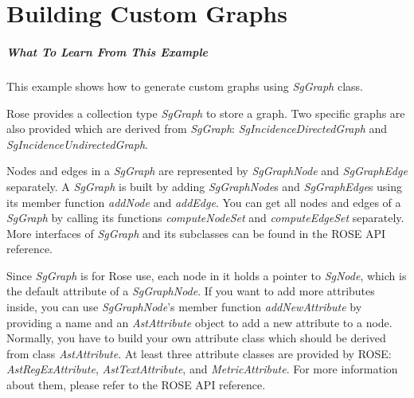 \chapter{Building Custom Graphs}
\label{Tutorial:chapterCustomGraphs}

\paragraph{What To Learn From This Example}
This example shows how to generate custom graphs using \textit{SgGraph} class.

Rose provides a collection type \textit{SgGraph} to store a graph. Two specific graphs
are also provided which are derived from \textit{SgGraph}: \textit{SgIncidenceDirectedGraph} and
\textit{SgIncidenceUndirectedGraph}.

Nodes and edges in a \textit{SgGraph} are represented by \textit{SgGraphNode} and \textit{SgGraphEdge} separately. 
A \textit{SgGraph} is built by adding \textit{SgGraphNode}s and \textit{SgGraphEdge}s using its member function
\textit{addNode} and \textit{addEdge}. You can get all nodes and edges of a \textit{SgGraph} by calling its functions
\textit{computeNodeSet} and \textit{computeEdgeSet} separately.
More interfaces of \textit{SgGraph} and its subclasses can be found in the ROSE API reference.

Since \textit{SgGraph} is for Rose use, each node in it holds a pointer to \textit{SgNode}, which is 
the default attribute of a \textit{SgGraphNode}. If you want to add more attributes inside, you
can use \textit{SgGraphNode}'s member function \textit{addNewAttribute} by providing a name and an \textit{AstAttribute}
object to add a new attribute to a node. Normally, you have to build your own 
attribute class which should be derived from class
\textit{AstAttribute}. At least three attribute
classes are provided by ROSE: \textit{AstRegExAttribute}, \textit{AstTextAttribute}, and \textit{MetricAttribute}. 
For more information about them, please refer to the ROSE API reference.

